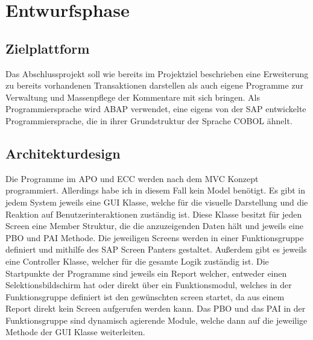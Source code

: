 \section{Entwurfsphase} 
\label{sec:Entwurfsphase}

\subsection{Zielplattform}
\label{sec:Zielplattform}
Das Abschlussprojekt soll wie bereits im Projektziel beschrieben eine Erweiterung zu bereits vorhandenen Transaktionen darstellen als auch eigene Programme zur Verwaltung und Massenpflege der Kommentare mit sich bringen. Als Programmiersprache wird \ac{ABAP} verwendet, eine eigens von der SAP entwickelte Programmiersprache, die in ihrer Grundstruktur der Sprache COBOL ähnelt.

\subsection{Architekturdesign}
\label{sec:Architekturdesign}
Die Programme im \ac{APO} und \ac{ECC} werden nach dem \ac{MVC} Konzept programmiert. Allerdings habe ich in diesem Fall kein Model benötigt. Es gibt in jedem System jeweils eine \ac{GUI} Klasse, welche für die visuelle Darstellung und die Reaktion auf Benutzerinteraktionen zuständig ist. Diese Klasse besitzt für jeden Screen eine Member Struktur, die die anzuzeigenden Daten hält und jeweils eine \ac{PBO} und \ac{PAI} Methode. Die jeweiligen Screens werden in einer Funktionsgruppe definiert und mithilfe des SAP Screen Panters gestaltet. Außerdem gibt es jeweils eine Controller Klasse, welcher für die gesamte Logik zuständig ist. Die Startpunkte der Programme sind jeweils ein Report welcher, entweder einen Selektionsbildschirm hat oder direkt über ein Funktionsmodul, welches in der Funktionsgruppe definiert ist den gewünschten screen startet, da aus einem Report direkt kein Screen aufgerufen werden kann. Das \ac{PBO} und das \ac{PAI} in der Funktionsgruppe sind dynamisch agierende Module, welche dann auf die jeweilige Methode der \ac{GUI} Klasse weiterleiten.

